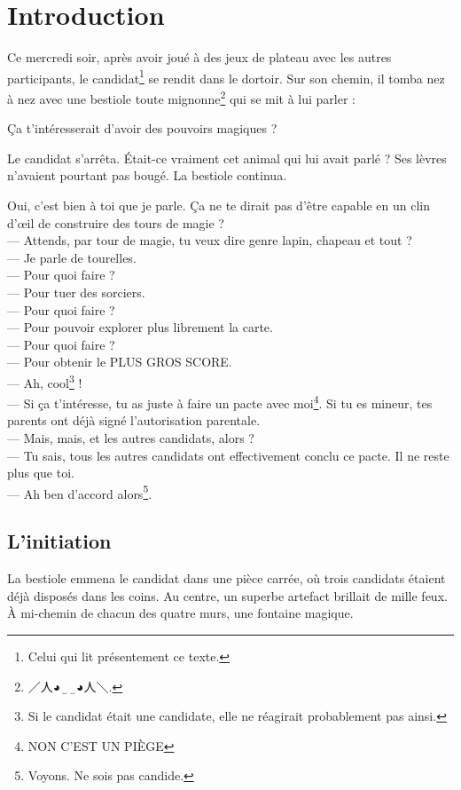 \section{Introduction}

Ce mercredi soir, après avoir joué à des jeux de plateau avec les autres participants, le candidat\footnote{Celui qui lit présentement ce texte.} se rendit dans le dortoir. Sur son chemin, il tomba nez à nez avec une bestiole toute mignonne\footnote{\J ／人{\A ◕‿‿◕}人＼.} qui se mit à lui parler :

\noindent
\og Ça t'intéresserait d'avoir des pouvoirs magiques ? \fg

Le candidat s'arrêta. Était-ce vraiment cet animal qui lui avait parlé ? Ses lèvres n'avaient pourtant pas bougé. La bestiole continua.

\noindent
\og Oui, c'est bien à toi que je parle. Ça ne te dirait pas d'être capable en un clin d'œil de construire des tours de magie ?\\
--- Attends, par tour de magie, tu veux dire genre lapin, chapeau et tout ?\\
--- Je parle de tourelles.\\
--- Pour quoi faire ?\\
--- Pour tuer des sorciers.\\
--- Pour quoi faire ?\\
--- Pour pouvoir explorer plus librement la carte.\\
--- Pour quoi faire ?\\
--- Pour obtenir le PLUS GROS SCORE.\\
--- Ah, cool\footnote{Si le candidat était une candidate, elle ne réagirait probablement pas ainsi.} !\\
--- Si ça t'intéresse, tu as juste à faire un pacte avec moi\footnote{NON C'EST UN PIÈGE}. Si tu es mineur, tes parents ont déjà signé l'autorisation parentale.\\
--- Mais, mais, et les autres candidats, alors ?\\
--- Tu sais, tous les autres candidats ont effectivement conclu ce pacte. Il ne reste plus que toi.\\
--- Ah ben d'accord alors\footnote{Voyons. Ne sois pas candide.}. \fg

\subsection{L'initiation}

La bestiole emmena le candidat dans une pièce carrée, où trois candidats étaient déjà disposés dans les coins. Au centre, un superbe artefact brillait de mille feux. À mi-chemin de chacun des quatre murs, une fontaine magique.

